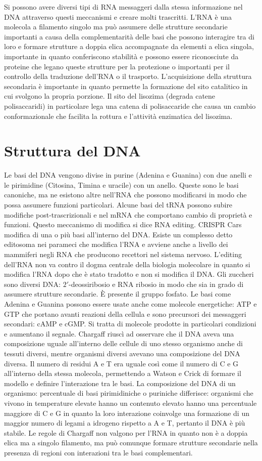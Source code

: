 Si possono avere diversi tipi di RNA messaggeri dalla stessa informazione nel DNA attraverso questi meccanismi e creare molti trascritti. L'RNA \`e una molecola a filamento singolo ma 
pu\`o assumere delle strutture secondarie importanti a causa della complementarit\`a delle basi che possono interagire tra di loro e formare strutture a doppia elica accompagnate da 
elementi a elica singola, importante in quanto conferiscono stabilit\`a e possono essere riconosciute da proteine che legano queste strutture per la protezione o importanti per il 
controllo della traduzione dell'RNA o il trasporto. L'acquisizione della struttura secondaria \`e importante in quanto permette la formazione del sito catalitico in cui svolgono la 
propria porzione. Il sito del lisozima (degrada catene polisaccaridi) in particolare lega una catena di polisaccaride che causa un cambio conformazionale che facilita la rottura e 
l'attivit\`a enzimatica del lisozima. 
\section{Struttura del DNA}
Le basi del DNA vengono divise in purine (Adenina e Guanina) con due anelli e le pirimidine (Citosina, Timina e uracile) con un anello. Queste sono le basi canoniche, ma ne esistono
altre nell'RNA che possono modificarsi in modo che possa assumere funzioni particolari. Alcune basi del tRNA possono subire modifiche post-trascrizionali e nel mRNA che comportano cambio
di propriet\`a e funzioni. Questo meccanismo di modifica si dice RNA editing. CRISPR Cars modifica di una o pi\`u basi all'interno del DNA. Esiste un complesso detto editosoma nei 
parameci che modifica l'RNA e avviene anche a livello dei mammiferi negli RNA che producono recettori nel sistema nervoso. L'editing dell'RNA non va contro il dogma centrale della
biologia molecolare in quanto si modifica l'RNA dopo che \`e stato tradotto e non si modifica il DNA. Gli zuccheri sono diversi DNA: $2'$-deossiribosio e RNA ribosio in modo che sia in 
grado di assumere strutture secondarie. \`E presente il gruppo fosfato. Le basi come Adenina e Guanina possono essere usate anche come molecole energetiche: ATP e GTP che portano avanti
reazioni della cellula e sono precursori dei messaggeri secondari: cAMP e cGMP. Si tratta di molecole prodotte in particolari condizioni e aumentano il segnale. Chargaff riusc\`i ad 
osservare che il DNA aveva una composizione uguale all'interno delle cellule di uno stesso organismo anche di tessuti diversi, mentre organismi diversi avevano una composizione del DNA
diversa. Il numero di residui A e T era uguale cos\`i come il numero di C e G all'interno della stessa molecola, permettendo a Watson e Crick di formare il modello e definire
l'interazione tra le basi. La composizione del DNA di un organismo: percentuale di basi pirimidiniche o puriniche differisce: organismi che vivono in temperature elevate hanno un 
contenuto elevato hanno una percentuale maggiore di C e G in quanto la loro interazione coinvolge una formazione di un maggior numero di legami a idrogeno rispetto a A e T, pertanto il 
DNA \`e pi\`u stabile. Le regole di Chargaff non valgono per l'RNA in quanto non \`e a doppia elica ma a singolo filamento, ma pu\`o comunque formare strutture secondarie nella presenza
di regioni con interazioni tra le basi complementari. 
